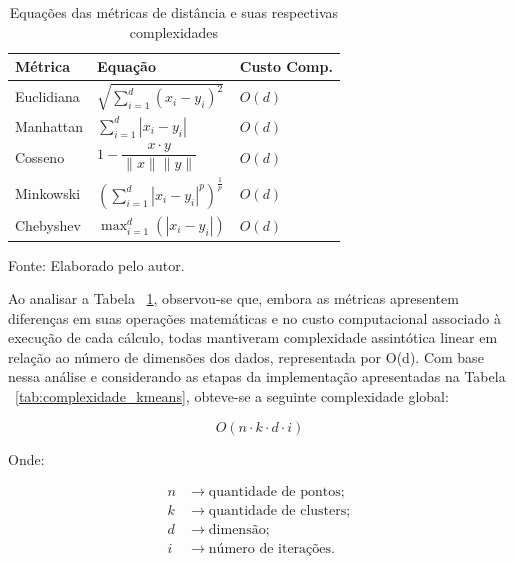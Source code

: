 \documentclass[10pt,a4paper,twocolumn]{article}
\begin{document}
\begin{table}[H]
\centering
\caption{Equações das métricas de distância e suas respectivas complexidades}
\label{tab:metricas_distancia}

\begin{tabularx}{\columnwidth}
{|>{\raggedright\arraybackslash}p{2.1cm}
|>{\centering\arraybackslash}X
|>{\centering\arraybackslash}p{1.6cm}|}
\hline

\textbf{Métrica} &
\textbf{Equação} &
\textbf{Custo Comp.}
\tabularnewline
\hline

Euclidiana &
$\sqrt{\sum_{i=1}^{d}(x_i-y_i)^2}$ &
$O(d)$
\tabularnewline
\hline

Manhattan &
$\sum_{i=1}^{d}|x_i-y_i|$ &
$O(d)$
\tabularnewline
\hline

Cosseno &
$1-\dfrac{x\cdot y}{\|x\|\|y\|}$ &
$O(d)$
\tabularnewline
\hline

Minkowski &
$\left(\sum_{i=1}^{d}|x_i-y_i|^p\right)^{\frac{1}{p}}$ &
$O(d)$
\tabularnewline
\hline

Chebyshev &
$\max_{i=1}^{d}(|x_i-y_i|)$ &
$O(d)$
\tabularnewline
\hline

\end{tabularx}

\smallskip
\footnotesize
Fonte: Elaborado pelo autor.

\end{table}


Ao analisar a Tabela ~\ref{tab:metricas_distancia}, observou-se que, embora as métricas apresentem diferenças em suas operações matemáticas e no custo computacional associado à execução de cada cálculo, todas mantiveram complexidade assintótica linear em relação ao número de dimensões dos dados, representada por O(d). Com base nessa análise e considerando as etapas da implementação apresentadas na Tabela ~\ref{tab:complexidade_kmeans}, obteve-se a seguinte complexidade global: 

\begin{equation}
\label{eq:complexidade_kmeans}
O(n \cdot k \cdot d \cdot i)
\end{equation}

Onde:

\[
\begin{aligned}
n &\rightarrow \text{quantidade de pontos};\\
k &\rightarrow \text{quantidade de clusters};\\
d &\rightarrow \text{dimensão};\\
i &\rightarrow \text{número de iterações}.
\end{aligned}
\]
\end{document}
